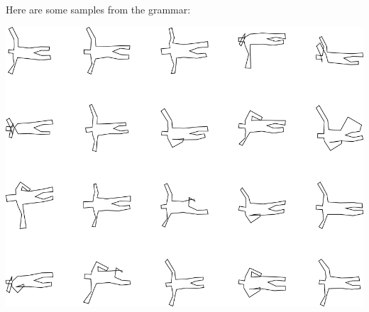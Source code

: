 Here are some samples from the grammar:

\includegraphics[width=6in]{output/3.learning/incremental/gram.18.d/samples.png}

